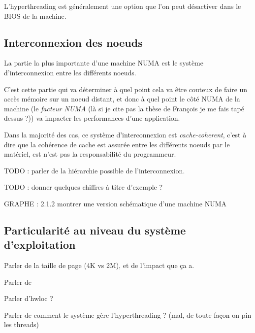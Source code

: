 L'hyperthreading est généralement une option que l'on peut désactiver dans le BIOS de la machine.


\subsection{Interconnexion des noeuds}\label{sec:context:numa:interconnect}

La partie la plus importante d'une machine NUMA est le système d'interconnexion entre les différents noeuds.

C'est cette partie qui va déterminer à quel point cela va être couteux de faire un accès mémoire sur un noeud distant, et donc à quel point le côté NUMA de la machine (le \emph{facteur NUMA} (là si je cite pas la thèse de François je me fais tapé dessus ?)) va impacter les performances d'une application.

Dans la majorité des cas, ce système d'interconnexion est \emph{cache-coherent}, c'est à dire que la cohérence de cache est assurée entre les différents noeuds par le matériel, est n'est pas la responsabilité du programmeur.

TODO : parler de la hiérarchie possible de l'interconnexion.

TODO : donner quelques chiffres à titre d'exemple ?

GRAPHE : 2.1.2 montrer une version schématique d'une machine NUMA


\subsection{Particularité au niveau du système d'exploitation}\label{sec:context:numa:os}


Parler de la taille de page (4K vs 2M), et de l'impact que ça a.

Parler de~\cite{Dobson2003}

Parler d'hwloc ?

Parler de comment le système gère l'hyperthreading ? (mal, de toute façon on pin les threads)


